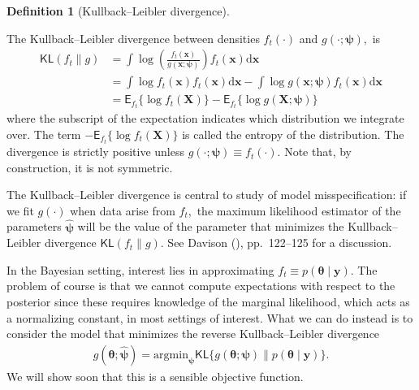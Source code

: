 \documentclass[
  11pt,
  letterpaper,
]{scrbook}
\theoremstyle{definition}
\theoremstyle{plain}
\theoremstyle{plain}
\theoremstyle{plain}
\theoremstyle{definition}
\theoremstyle{definition}
\newtheorem{definition}{Definition}[chapter]
\theoremstyle{plain}
\theoremstyle{plain}
\theoremstyle{remark}
\begin{document}
\begin{definition}[Kullback--Leibler
divergence]\protect\hypertarget{def-kl-divergence}{}\label{def-kl-divergence}

The Kullback--Leibler divergence between densities \(f_t(\cdot)\) and
\(g(\cdot; \boldsymbol{\psi}),\) is \begin{align*}
\mathsf{KL}(f_t \parallel g) &=\int \log \left(\frac{f_t(\boldsymbol{x})}{g(\boldsymbol{x}; \boldsymbol{\psi})}\right) f_t(\boldsymbol{x}) \mathrm{d} \boldsymbol{x}\\
&= \int \log f_t(\boldsymbol{x}) f_t(\boldsymbol{x}) \mathrm{d} \boldsymbol{x} - \int \log g(\boldsymbol{x}; \boldsymbol{\psi}) f_t(\boldsymbol{x}) \mathrm{d} \boldsymbol{x}
\\ &= \mathsf{E}_{f_t}\{\log f_t(\boldsymbol{X})\} - \mathsf{E}_{f_t}\{\log g(\boldsymbol{X}; \boldsymbol{\psi})\}
\end{align*} where the subscript of the expectation indicates which
distribution we integrate over. The term
\(-\mathsf{E}_{f_t}\{\log f_t(\boldsymbol{X})\}\) is called the entropy
of the distribution. The divergence is strictly positive unless
\(g(\cdot; \boldsymbol{\psi}) \equiv f_t(\cdot).\) Note that, by
construction, it is not symmetric.

\end{definition}

The Kullback--Leibler divergence is central to study of model
misspecification: if we fit \(g(\cdot)\) when data arise from \(f_t,\)
the maximum likelihood estimator of the parameters
\(\widehat{\boldsymbol{\psi}}\) will be the value of the parameter that
minimizes the Kullback--Leibler divergence
\(\mathsf{KL}(f_t \parallel g).\) See Davison
(), pp.~122--125 for a discussion.

In the Bayesian setting, interest lies in approximating
\(f_t \equiv p(\boldsymbol{\theta} \mid \boldsymbol{y}).\) The problem
of course is that we cannot compute expectations with respect to the
posterior since these requires knowledge of the marginal likelihood,
which acts as a normalizing constant, in most settings of interest. What
we can do instead is to consider the model that minimizes the reverse
Kullback--Leibler divergence \begin{align*}
g(\boldsymbol{\theta}; \widehat{\boldsymbol{\psi}}) = \mathrm{argmin}_{\boldsymbol{\psi}} \mathsf{KL}\{g(\boldsymbol{\theta};\boldsymbol{\psi}) \parallel p(\boldsymbol{\theta} \mid \boldsymbol{y})\}.
\end{align*} We will show soon that this is a sensible objective
function.
\end{document}
